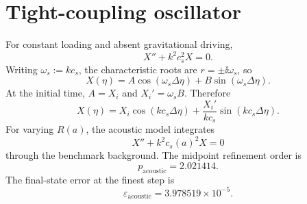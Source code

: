 \section{Tight-coupling oscillator}
For constant loading and absent gravitational driving,
\begin{equation}
X''+k^2c_s^2X=0.
\end{equation}
Writing \(\omega_s:=kc_s\), the characteristic roots are \(r=\pm\ii\omega_s\), so
\begin{equation}
X(\eta)=A\cos(\omega_s\Delta\eta)
+B\sin(\omega_s\Delta\eta).
\end{equation}
At the initial time, \(A=X_i\) and \(X_i'=\omega_sB\).  Therefore
\begin{equation}
X(\eta)=X_i\cos(kc_s\Delta\eta)
+\frac{X_i'}{kc_s}\sin(kc_s\Delta\eta).
\end{equation}
For varying \(R(a)\), the acoustic model integrates
\begin{equation}
X''+k^2c_s(a)^2X=0
\end{equation}
through the benchmark background. The midpoint refinement order is
\begin{equation}
p_{\mathrm{acoustic}}=2.021414.
\end{equation}
The final-state error at the finest step is
\begin{equation}
\varepsilon_{\mathrm{acoustic}}
=3.978519\times10^{-5}.
\end{equation}

